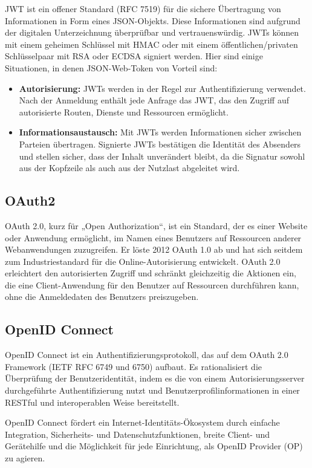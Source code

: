 JWT ist ein offener Standard (RFC 7519) für die sichere Übertragung von Informationen in Form eines JSON-Objekts. Diese Informationen sind aufgrund der digitalen Unterzeichnung überprüfbar und vertrauenswürdig. JWTs können mit einem geheimen Schlüssel mit HMAC oder mit einem öffentlichen/privaten Schlüsselpaar mit RSA oder ECDSA signiert werden. Hier sind einige Situationen, in denen JSON-Web-Token von Vorteil sind:

\begin{itemize}
	\item \textbf{Autorisierung:}  JWTs werden in der Regel zur Authentifizierung verwendet. Nach der Anmeldung enthält jede Anfrage das JWT, das den Zugriff auf autorisierte Routen, Dienste und Ressourcen ermöglicht.
	\item \textbf{Informationsaustausch:} Mit JWTs werden Informationen sicher zwischen Parteien übertragen. Signierte JWTs bestätigen die Identität des Absenders und stellen sicher, dass der Inhalt unverändert bleibt, da die Signatur sowohl aus der Kopfzeile als auch aus der Nutzlast abgeleitet wird\cite{JWT:o.J}.
\end{itemize}

\subsection{OAuth2}
OAuth 2.0, kurz für „Open Authorization“, ist ein Standard, der es einer Website oder Anwendung ermöglicht, im Namen eines Benutzers auf Ressourcen anderer Webanwendungen zuzugreifen. Er löste 2012 OAuth 1.0 ab und hat sich seitdem zum Industriestandard für die Online-Autorisierung entwickelt. OAuth 2.0 erleichtert den autorisierten Zugriff und schränkt gleichzeitig die Aktionen ein, die eine Client-Anwendung für den Benutzer auf Ressourcen durchführen kann, ohne die Anmeldedaten des Benutzers preiszugeben\cite{OAuth2:o.J}.

\subsection{OpenID Connect}
OpenID Connect ist ein Authentifizierungsprotokoll, das auf dem OAuth 2.0 Framework (IETF RFC 6749 und 6750) aufbaut. Es rationalisiert die Überprüfung der Benutzeridentität, indem es die von einem Autorisierungsserver durchgeführte Authentifizierung nutzt und Benutzerprofilinformationen in einer RESTful und interoperablen Weise bereitstellt.

OpenID Connect fördert ein Internet-Identitäts-Ökosystem durch einfache Integration, Sicherheits- und Datenschutzfunktionen, breite Client- und Gerätehilfe und die Möglichkeit für jede Einrichtung, als OpenID Provider (OP) zu agieren\cite{OpenId:o.J}.


